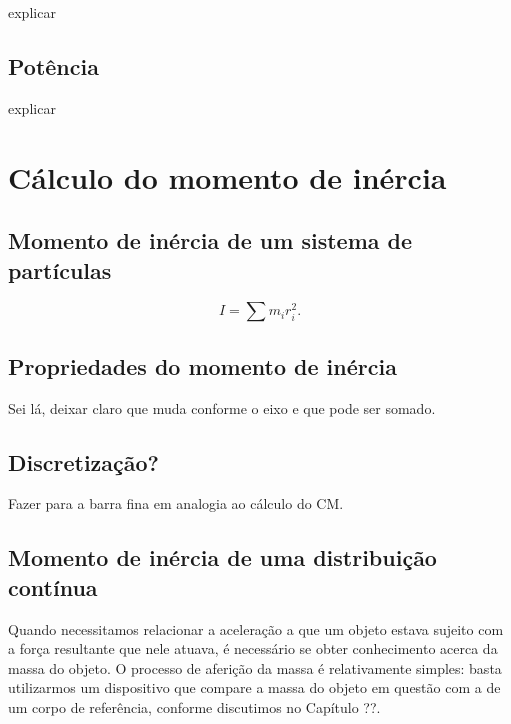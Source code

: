 explicar

\subsection{Potência}

explicar

\section{Cálculo do momento de inércia}

\subsection{Momento de inércia de um sistema de partículas}

\begin{equation}
  I = \sum m_i r_i^2.
\end{equation}

\subsection{Propriedades do momento de inércia}

Sei lá, deixar claro que muda conforme o eixo e que pode ser somado.


\subsection{Discretização?}

Fazer para a barra fina em analogia ao cálculo do CM.

\subsection{Momento de inércia de uma distribuição contínua}

Quando necessitamos relacionar a aceleração a que um objeto estava sujeito com a força resultante que nele atuava, é necessário se obter conhecimento acerca da massa do objeto. O processo de aferição da massa é relativamente simples: basta utilizarmos um dispositivo que compare a massa do objeto em questão com a de um corpo de referência, conforme discutimos no Capítulo ??.

